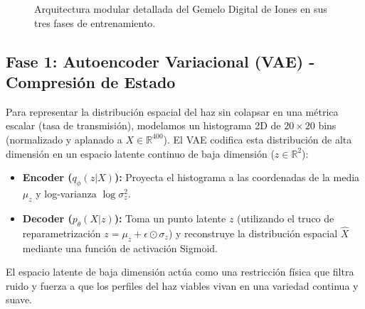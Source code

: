 \documentclass[12pt,letterpaper]{article}
\begin{document}
\begin{figure}[H]
    \caption{Arquitectura modular detallada del Gemelo Digital de Iones en sus tres fases de entrenamiento.}
    \label{fig:arquitectura_block}
\end{figure}

\subsection{Fase 1: Autoencoder Variacional (VAE) - Compresión de Estado}
Para representar la distribución espacial del haz sin colapsar en una métrica escalar (tasa de transmisión), modelamos un histograma 2D de $20 \times 20$ bins (normalizado y aplanado a $X \in \mathbb{R}^{400}$). 
El VAE codifica esta distribución de alta dimensión en un espacio latente continuo de baja dimensión ($z \in \mathbb{R}^2$):
\begin{itemize}
    \item \textbf{Encoder ($q_\phi(z|X)$):} Proyecta el histograma a las coordenadas de la media $\mu_z$ y log-varianza $\log\sigma_z^2$.
    \item \textbf{Decoder ($p_\theta(X|z)$):} Toma un punto latente $z$ (utilizando el truco de reparametrización $z = \mu_z + \epsilon \odot \sigma_z$) y reconstruye la distribución espacial $\hat{X}$ mediante una función de activación Sigmoid.
\end{itemize}
El espacio latente de baja dimensión actúa como una restricción física que filtra ruido y fuerza a que los perfiles del haz viables vivan en una variedad continua y suave.
\end{document}

